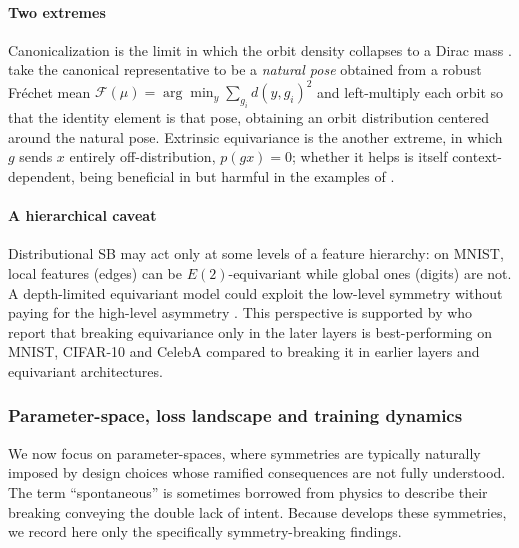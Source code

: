 \documentclass[mathematics,review,submit,moreauthors]{Definitions/mdpi}
\begin{document}
\paragraph{Two extremes}
Canonicalization is the limit in which the orbit density collapses to a Dirac mass \citep{ciuclea2025,urbano2026}.
\citet{urbano2026} take the canonical representative to be a \emph{natural pose} obtained from a robust Fréchet mean $\mathcal{F}(\mu)=\arg\min_{y}\sum_{g_i}d(y,g_i)^2$ and left-multiply each orbit so that the identity element is that pose, obtaining an orbit distribution centered around the natural pose.
Extrinsic equivariance is the another extreme, in which $g$ sends $x$ entirely off-distribution, $p(gx)=0$; whether it helps is itself context-dependent, being beneficial in \citet{wang2022b} but harmful in the examples of \citet{wang2023a}.

\paragraph{A hierarchical caveat}
Distributional SB may act only at some levels of a feature hierarchy: on MNIST, local features (edges) can be $E(2)$-equivariant while global ones (digits) are not.
A depth-limited equivariant model could exploit the low-level symmetry without paying for the high-level asymmetry \citep[Fig.~2c]{weiler2019anips}.
This perspective is supported by \citet{elsayed2020p3icml} who report that breaking equivariance only in the later layers is best-performing on MNIST, CIFAR-10 and CelebA compared to breaking it in earlier layers and equivariant architectures.

\subsubsection{Parameter-space, loss landscape and training dynamics}\label{sec:param-space-sb}
We now focus on parameter-spaces, where symmetries are typically naturally imposed by design choices whose ramified consequences are not fully understood.
The term ``spontaneous'' is sometimes borrowed from physics to describe their breaking conveying the double lack of intent.
Because  develops these symmetries, we record here only the specifically symmetry-breaking findings.
\end{document}
